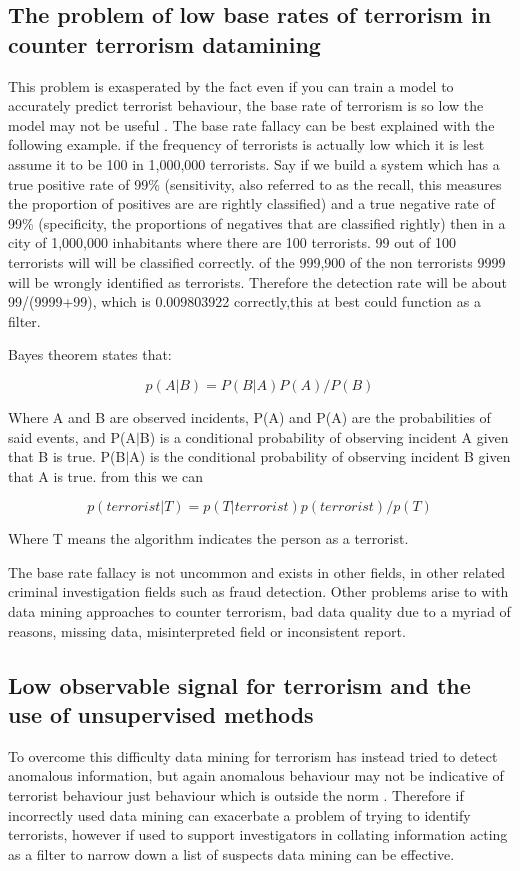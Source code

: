 \subsection{The problem of low base rates of terrorism in counter terrorism datamining}
This problem is exasperated by the fact even if you can train a model to accurately predict terrorist behaviour, the base rate of terrorism is so low the model may not be useful \citep{jensen2003information}. The base rate fallacy can be best explained with the following example. if the frequency of terrorists is actually low which it is lest assume it to be 100 in 1,000,000 terrorists. Say if we build a system which has a true positive rate of 99\% (sensitivity, also referred to as the recall, this measures the proportion of positives are are rightly classified) and a true negative rate of 99\% (specificity, the proportions of negatives that are classified rightly) then in a city of 1,000,000 inhabitants where there are 100 terrorists. 99 out of 100 terrorists will will be classified correctly. of the 999,900 of the non terrorists 9999 will be wrongly identified as terrorists. Therefore the detection rate will be about 99/(9999+99), which is  0.009803922 correctly,this at best could function as a filter. 

Bayes theorem states that:

\begin{equation} p(A|B)=P(B|A)P(A)/P(B) \label{eq1bayes}  \end{equation}

Where A and B are observed incidents, P(A) and P(A) are the probabilities of said events, and P(A$\vert$B) is a conditional probability of observing incident A given that B is true. P(B$\vert$A) is the conditional probability of observing incident B given that A is true. from this we can 
 
\begin{equation} p(terrorist|T)=p(T|terrorist)p(terrorist)/p(T) \label{eq2bayes}  \end{equation}

Where T means the algorithm indicates the person as a terrorist.

The base rate fallacy is not uncommon and exists in other fields, in other related criminal investigation fields such as fraud detection. Other problems arise to with data mining approaches to counter terrorism, bad data quality due to a myriad of reasons, missing data, misinterpreted field or inconsistent report. 

\subsection{Low observable signal for terrorism and the use of unsupervised methods}
To overcome this difficulty data mining for terrorism has instead tried to detect anomalous information, but again anomalous behaviour may not be indicative of terrorist behaviour just behaviour which is outside the norm \citep{thuraisingham2004data}. Therefore if incorrectly used data mining can exacerbate a problem of trying to identify terrorists, however if used to support investigators in collating information acting as a filter to narrow down a list of suspects data mining can be effective.


